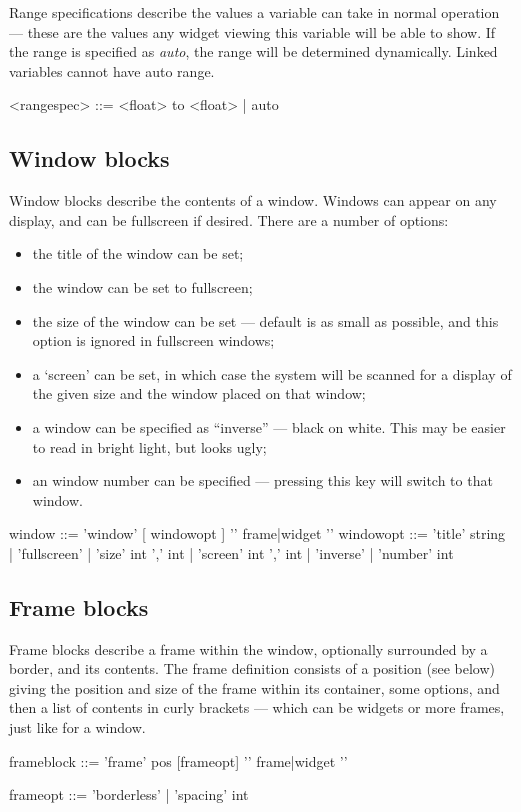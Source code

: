 Range specifications describe the values a variable can take in
normal operation --- these are the values any widget viewing this
variable will be able to show. If the range is specified as \emph{auto},
the range will be determined dynamically. Linked variables cannot
have auto range.
\begin{v}
<rangespec> ::= <float> to <float>
                | auto
\end{v}

\subsection{Window blocks}
Window blocks describe the contents of a window. Windows can appear
on any display, and can be fullscreen if desired.
There are a number of options:
\begin{itemize}
\item the title of the window can be set;
\item the window can be set to fullscreen;
\item the size of the window can be set --- default is as small as possible, and this option
is ignored in fullscreen windows;
\item a `screen' can be set, in which case the system will be scanned for a display of the given
size and the window placed on that window;
\item a window can be specified as ``inverse'' --- black on white. This may
be easier to read in bright light, but looks ugly;
\item an window number can be specified --- pressing this key will
switch to that window.
\end{itemize}

\begin{v}
window      ::= 'window' [ {windowopt} ] '{' {frame|widget} '}'
windowopt   ::= 'title' string
            |   'fullscreen'
            |   'size' int ',' int
            |   'screen' int ',' int
            |   'inverse'
            |   'number' int
\end{v}


\subsection{Frame blocks}
Frame blocks describe a frame within the window, optionally surrounded by a border, and its contents.
The frame definition consists of a position (see below) giving the position and size of the frame within its container,
some options, and then a list of contents in curly brackets --- which can be widgets or more frames, just like for a window.
\begin{v}
frameblock  ::= 'frame' pos [{frameopt}] '{' {frame|widget} '}'

frameopt    ::= 'borderless'
            |   'spacing' int

\end{v}

